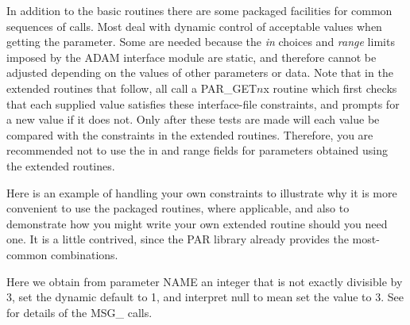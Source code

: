 \documentclass[twoside,11pt,nolof]{starlink}
\begin{document}
In addition to the basic routines there are some packaged facilities for
common sequences of calls.  Most deal with dynamic control of acceptable
values when getting the parameter.  Some are needed because the \emph{in\/} choices and \emph{range\/} limits imposed by the {\footnotesize
ADAM} interface module are static, and therefore cannot be adjusted
depending on the values of other parameters or data.  Note that in the
extended routines that follow, all call a PAR\_GET$n$x routine which
first checks that each supplied value satisfies these interface-file
constraints, and prompts for a new value if it does not.  Only after
these tests are made will each value be compared with the constraints in
the extended routines.  Therefore, you are recommended not to use the in
and range fields for parameters obtained using the extended routines.

Here is an example of handling your own constraints to illustrate why it
is more convenient to use the packaged routines, where applicable, and
also to demonstrate how you might write your own extended routine should
you need one. It is a little contrived, since the PAR library already
provides the most-common combinations.

Here we obtain from parameter NAME an integer that is not exactly
divisible by 3, set the dynamic default to 1, and interpret null to
mean set the value to 3.  See
 for details of the MSG\_ calls.
\end{document}
